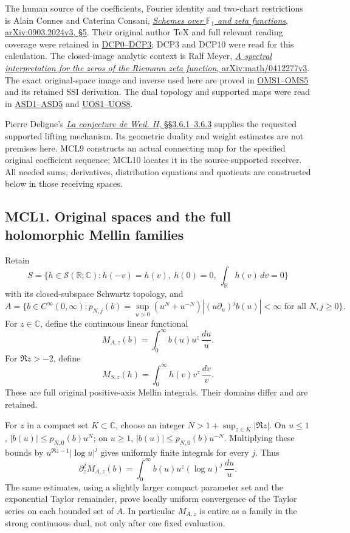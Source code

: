 The human source of the coefficients, Fourier identity and two-chart
restrictions is Alain Connes and Caterina Consani,
\href{https://arxiv.org/abs/0903.2024v3}{\emph{Schemes over
\(\mathbb F_1\) and zeta functions}, arXiv:0903.2024v3, §5}. Their
original author TeX and full relevant reading coverage were retained in
\href{SOURCE_CC_DOUBLE_PULLBACK.md}{DCP0--DCP3}; DCP3 and DCP10 were
read for this calculation. The closed-image analytic context is Ralf
Meyer, \href{https://arxiv.org/abs/math/0412277v3}{\emph{A spectral
interpretation for the zeros of the Riemann zeta function},
arXiv:math/0412277v3}. The exact original-space image and inverse used
here are proved in
\href{ORIGINAL_MELLIN_SPECTRAL_SYNTHESIS.md}{OMS1--OMS5} and its
retained SSI derivation. The dual topology and supported maps were read
in \href{ACTUAL_SUPPORTED_DUALITY_INDEPENDENT.md}{ASD1--ASD5} and
\href{GLOBAL_UNIT_ORBIT_AND_SUPPORTED_COMPARISON.md}{UOS1--UOS8}.

Pierre Deligne's
\href{https://www.numdam.org/item/PMIHES_1980__52__137_0/}{\emph{La
conjecture de Weil. II}, §§3.6.1--3.6.3} supplies the requested
supported lifting mechanism. Its geometric duality and weight estimates
are not premises here. MCL9 constructs an actual connecting map for the
specified original coefficient sequence; MCL10 locates it in the
source-supported receiver. All needed sums, derivatives, distribution
equations and quotients are constructed below in those receiving spaces.

\subsection{MCL1. Original spaces and the full holomorphic Mellin
families}\label{mcl1.-original-spaces-and-the-full-holomorphic-mellin-families}

Retain \[
 S=\{h\in\mathcal S(\mathbb R;\mathbb C):
 h(-v)=h(v),\ h(0)=0,\ \int_{\mathbb R}h(v)\,dv=0\}
\] with its closed-subspace Schwartz topology, and \[
 A=\{b\in C^\infty(0,\infty):
 p_{N,j}(b)=\sup_{u>0}(u^N+u^{-N})|(u\partial_u)^jb(u)|<\infty
 \text{ for all }N,j\ge0\}.
 \tag{MCL1.1}
\] For \(z\in\mathbb C\), define the continuous linear functional \[
 M_{A,z}(b)=\int_0^\infty b(u)u^z\,\frac{du}{u}.
 \tag{MCL1.2}
\] For \(\Re z>-2\), define \[
 M_{S,z}(h)=\int_0^\infty h(v)v^z\,\frac{dv}{v}.
 \tag{MCL1.3}
\] These are full original positive-axis Mellin integrals. Their domains
differ and are retained.

For \(z\) in a compact set \(K\subset\mathbb C\), choose an integer
\(N>1+\sup_{z\in K}|\Re z|\). On \(u\le1\), \(|b(u)|\le p_{N,0}(b)u^N\);
on \(u\ge1\), \(|b(u)|\le p_{N,0}(b)u^{-N}\). Multiplying these bounds
by \(u^{\Re z-1}|\log u|^j\) gives uniformly finite integrals for every
\(j\). Thus \[
 \partial_z^jM_{A,z}(b)
 =\int_0^\infty b(u)u^z(\log u)^j\,\frac{du}{u}.
 \tag{MCL1.4}
\] The same estimates, using a slightly larger compact parameter set and
the exponential Taylor remainder, prove locally uniform convergence of
the Taylor series on each bounded set of \(A\). In particular
\(M_{A,z}\) is entire as a family in the strong continuous dual, not
only after one fixed evaluation.

